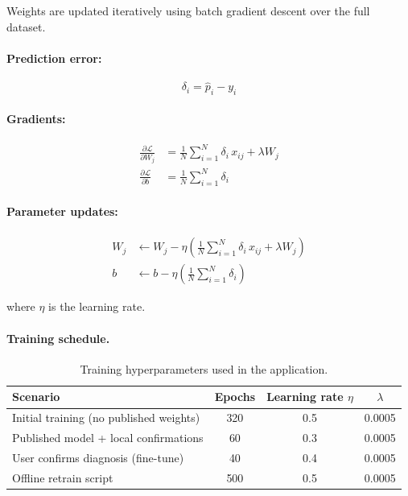 Weights are updated iteratively using batch gradient descent over the full dataset.

\paragraph{Prediction error:}
\begin{equation}
    \delta_i = \hat{p}_i - y_i
\end{equation}

\paragraph{Gradients:}
\begin{align}
    \frac{\partial \mathcal{L}}{\partial W_j} &= \frac{1}{N}\sum_{i=1}^{N} \delta_i \, x_{ij} + \lambda W_j
    \label{eq:grad-w} \\
    \frac{\partial \mathcal{L}}{\partial b} &= \frac{1}{N}\sum_{i=1}^{N} \delta_i
    \label{eq:grad-b}
\end{align}

\paragraph{Parameter updates:}
\begin{align}
    W_j &\leftarrow W_j - \eta \left( \frac{1}{N}\sum_{i=1}^{N} \delta_i \, x_{ij} + \lambda W_j \right)
    \label{eq:update-w} \\
    b &\leftarrow b - \eta \left( \frac{1}{N}\sum_{i=1}^{N} \delta_i \right)
    \label{eq:update-b}
\end{align}

where $\eta$ is the learning rate.

\paragraph{Training schedule.}
\begin{table}[h]
\centering
\begin{tabular}{lccc}
\hline
\textbf{Scenario} & \textbf{Epochs} & \textbf{Learning rate $\eta$} & \textbf{$\lambda$} \\
\hline
Initial training (no published weights) & 320 & 0.5 & 0.0005 \\
Published model + local confirmations & 60 & 0.3 & 0.0005 \\
User confirms diagnosis (fine-tune) & 40 & 0.4 & 0.0005 \\
Offline retrain script & 500 & 0.5 & 0.0005 \\
\hline
\end{tabular}
\caption{Training hyperparameters used in the application.}
\end{table}

